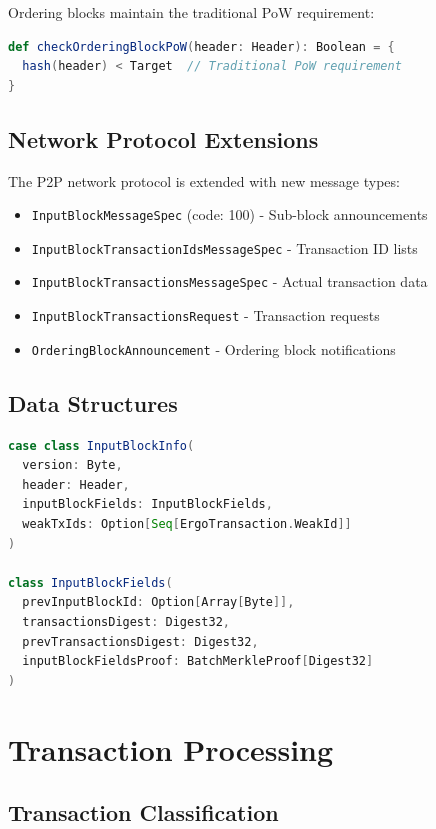 \documentclass{llncs}
\newcommand{\code}[1]{\texttt{#1}}
\begin{document}
Ordering blocks maintain the traditional PoW requirement:
\begin{lstlisting}[language=Scala,caption=Ordering Block PoW Validation]
def checkOrderingBlockPoW(header: Header): Boolean = {
  hash(header) < Target  // Traditional PoW requirement
}
\end{lstlisting}

\subsection{Network Protocol Extensions}

The P2P network protocol is extended with new message types:

\begin{itemize}
\item \code{InputBlockMessageSpec} (code: 100) - Sub-block announcements
\item \code{InputBlockTransactionIdsMessageSpec} - Transaction ID lists
\item \code{InputBlockTransactionsMessageSpec} - Actual transaction data
\item \code{InputBlockTransactionsRequest} - Transaction requests
\item \code{OrderingBlockAnnouncement} - Ordering block notifications
\end{itemize}

\subsection{Data Structures}

\begin{lstlisting}[language=Scala,caption=Input Block Data Structures]
case class InputBlockInfo(
  version: Byte,
  header: Header,
  inputBlockFields: InputBlockFields,
  weakTxIds: Option[Seq[ErgoTransaction.WeakId]]
)

class InputBlockFields(
  prevInputBlockId: Option[Array[Byte]],
  transactionsDigest: Digest32,
  prevTransactionsDigest: Digest32,
  inputBlockFieldsProof: BatchMerkleProof[Digest32]
)
\end{lstlisting}

\section{Transaction Processing}

\subsection{Transaction Classification}
\end{document}
